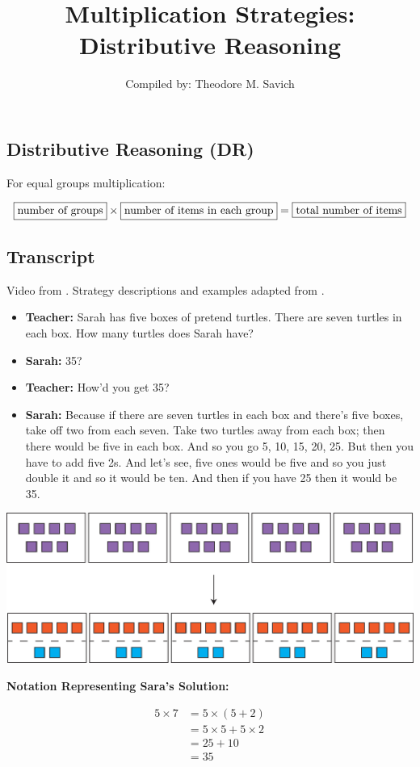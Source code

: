 \documentclass[11pt]{article}
\title{Multiplication Strategies: Distributive Reasoning}
\author{Compiled by: Theodore M. Savich}
\begin{document}
\maketitle
\subsection*{Distributive Reasoning (DR)}
For equal groups multiplication: 

\begin{equation*}
    \fbox{\text{number of groups}} \times \fbox{\text{number of items in each group}} = \fbox{\text{total number of items}}
\end{equation*}

\subsection*{Transcript}
Video from \textcite{Carpenter1999}. Strategy descriptions and examples adapted from \textcite{HackenbergCourseNotes}. 
\begin{itemize}
\item \textbf{Teacher:} Sarah has five boxes of pretend turtles. There are seven turtles in each box. How many turtles does Sarah have? 
\item \textbf{Sarah:} 35?
\item \textbf{Teacher:} How'd you get 35? 
\item \textbf{Sarah:} Because if there are seven turtles in each box and there's five boxes, take off two from each seven. Take two turtles away from each box; then there would be five in each box. And so you go 5, 10, 15, 20, 25. But then you have to add five 2s. And let's see, five ones would be five and so you just double it and so it would be ten. And then if you have 25 then it would be 35.
\end{itemize}

\includegraphics[width=.8\textwidth]{images/Easy_Pictures/SMR_MULT_DR/PDF/SMR_MULT_DR.pdf}

\noindent \textbf{Notation Representing Sara's Solution:}

\begin{align*}
5\times 7 &= 5 \times (5 + 2)\\
&= 5 \times 5 + 5 \times 2\\
& = 25 +10\\
&=35
\end{align*}
\end{document}
